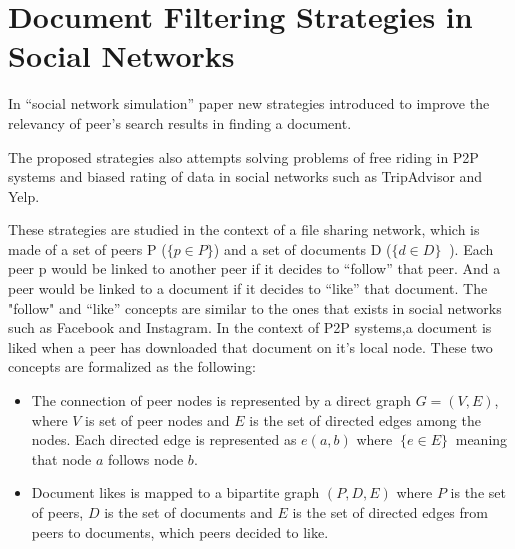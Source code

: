 \documentclass [12pt]{article} \usepackage{multicol}
\begin{document}
\section{Document Filtering Strategies in Social Networks}
						In ``social network simulation'' paper new strategies 
	introduced to improve the relevancy of peer's search results in finding a document.  
	 

						The proposed strategies also attempts solving
					problems  of free riding in P2P systems and
					biased rating of data in social networks such as
					TripAdvisor and Yelp.

					 These strategies are studied in the context of a
				 file sharing network, which is made of  a set of
				 peers P ($ \{p \in P\} $) and a set of documents D ($
				 \{d \in D\}\ $ ). Each peer p  would be linked to
				 another peer if it decides to ``follow'' that peer.
				 And a peer would be linked to a document if it
				 decides to ``like'' that document. The "follow" and
				 ``like'' concepts are similar to the ones that
				 exists in social networks such as Facebook and
				 Instagram. In the context of P2P systems,a document
				 is liked when a peer has downloaded that document on
				 it's local node. These two concepts are formalized
				 as the following:
				
				\begin{itemize} \item The connection of peer nodes is represented by
			a direct graph $ G = (V,E)$, where $V$ is set of peer nodes and $E$  is the set of
			directed edges among the nodes. Each directed edge is represented as $e(a,b)$ where $\ \{e \in E\} \ $  meaning 
			 that node $a$ follows node $b$. 

				\item  Document likes is mapped to a bipartite graph
			$(P,D,E)$ where $P$ is the set of peers, $D$ is the set of documents
			and $E$ is the set of directed edges from peers to documents, which peers decided to like.
		\end{itemize}
\end{document}

